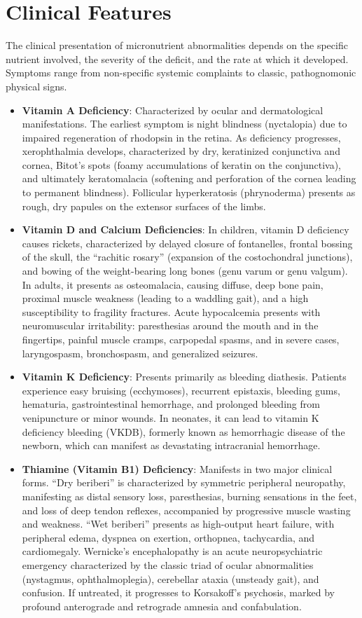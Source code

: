 \section*{Clinical Features}
The clinical presentation of micronutrient abnormalities depends on the specific nutrient involved, the severity of the deficit, and the rate at which it developed. Symptoms range from non-specific systemic complaints to classic, pathognomonic physical signs.
\begin{itemize}
\item \textbf{Vitamin A Deficiency}: Characterized by ocular and dermatological manifestations. The earliest symptom is night blindness (nyctalopia) due to impaired regeneration of rhodopsin in the retina. As deficiency progresses, xerophthalmia develops, characterized by dry, keratinized conjunctiva and cornea, Bitot's spots (foamy accumulations of keratin on the conjunctiva), and ultimately keratomalacia (softening and perforation of the cornea leading to permanent blindness). Follicular hyperkeratosis (phrynoderma) presents as rough, dry papules on the extensor surfaces of the limbs.
\item \textbf{Vitamin D and Calcium Deficiencies}: In children, vitamin D deficiency causes rickets, characterized by delayed closure of fontanelles, frontal bossing of the skull, the ``rachitic rosary'' (expansion of the costochondral junctions), and bowing of the weight-bearing long bones (genu varum or genu valgum). In adults, it presents as osteomalacia, causing diffuse, deep bone pain, proximal muscle weakness (leading to a waddling gait), and a high susceptibility to fragility fractures. Acute hypocalcemia presents with neuromuscular irritability: paresthesias around the mouth and in the fingertips, painful muscle cramps, carpopedal spasms, and in severe cases, laryngospasm, bronchospasm, and generalized seizures.
\item \textbf{Vitamin K Deficiency}: Presents primarily as bleeding diathesis. Patients experience easy bruising (ecchymoses), recurrent epistaxis, bleeding gums, hematuria, gastrointestinal hemorrhage, and prolonged bleeding from venipuncture or minor wounds. In neonates, it can lead to vitamin K deficiency bleeding (VKDB), formerly known as hemorrhagic disease of the newborn, which can manifest as devastating intracranial hemorrhage.
\item \textbf{Thiamine (Vitamin B1) Deficiency}: Manifests in two major clinical forms. ``Dry beriberi'' is characterized by symmetric peripheral neuropathy, manifesting as distal sensory loss, paresthesias, burning sensations in the feet, and loss of deep tendon reflexes, accompanied by progressive muscle wasting and weakness. ``Wet beriberi'' presents as high-output heart failure, with peripheral edema, dyspnea on exertion, orthopnea, tachycardia, and cardiomegaly. Wernicke's encephalopathy is an acute neuropsychiatric emergency characterized by the classic triad of ocular abnormalities (nystagmus, ophthalmoplegia), cerebellar ataxia (unsteady gait), and confusion. If untreated, it progresses to Korsakoff's psychosis, marked by profound anterograde and retrograde amnesia and confabulation.

\end{itemize}
